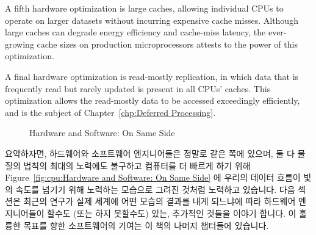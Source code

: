 A fifth hardware optimization is large caches, allowing individual
CPUs to operate on larger datasets without incurring expensive cache
misses.
Although large caches can degrade energy efficiency and cache-miss
latency, the ever-growing cache sizes on production microprocessors
attests to the power of this optimization.

A final hardware optimization is read-mostly replication, in which
data that is frequently read but rarely updated is present in all
CPUs' caches.
This optimization allows the read-mostly data to be accessed
exceedingly efficiently, and is the subject of
Chapter~\ref{chp:Deferred Processing}.

\fi

\begin{figure}[tb]
\centering
{}
\caption{Hardware and Software: On Same Side}
\end{figure}

요약하자면, 하드웨어와 소프트웨어 엔지니어들은 정말로 같은 쪽에 있으며, 둘 다
물질의 법칙의 최대의 노력에도 불구하고 컴퓨터를 더 빠르게 하기 위해
Figure~\ref{fig:cpu:Hardware and Software: On Same Side}
에 우리의 데이터 흐름이 빛의 속도를 넘기기 위해 노력하는 모습으로 그려진 것처럼
노력하고 있습니다.
다음 섹션은 최근의 연구가 실제 세계에 어떤 모습의 결과를 내게 되느냐에 따라
하드웨어 엔지니어들이 할수도 (또는 하지 못할수도) 있는, 추가적인 것들을 이야기
합니다.
이 훌륭한 목표를 향한 소프트웨어의 기여는 이 책의 나머지 챕터들에 있습니다.

